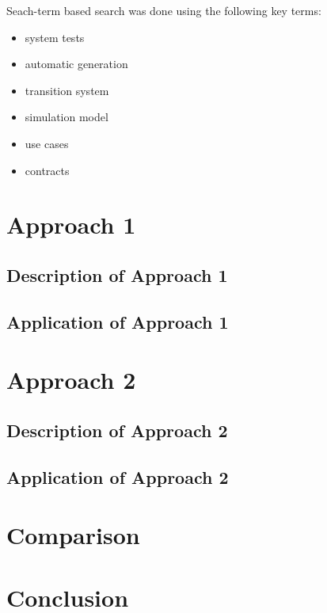 
Seach-term based search was done using the following key terms:

\begin{itemize}
	\item system tests
	\item automatic generation
	\item transition system
	\item simulation model
	\item use cases
	\item contracts
\end{itemize} 



\section{Approach 1} \label{approachone}

\subsection{Description of Approach 1}

\subsection{Application of Approach 1}

\section{Approach 2} \label{approachtwo}

\subsection{Description of Approach 2}

\subsection{Application of Approach 2}

\section{Comparison} \label{comparison}


\section{Conclusion} \label{conclusion}

